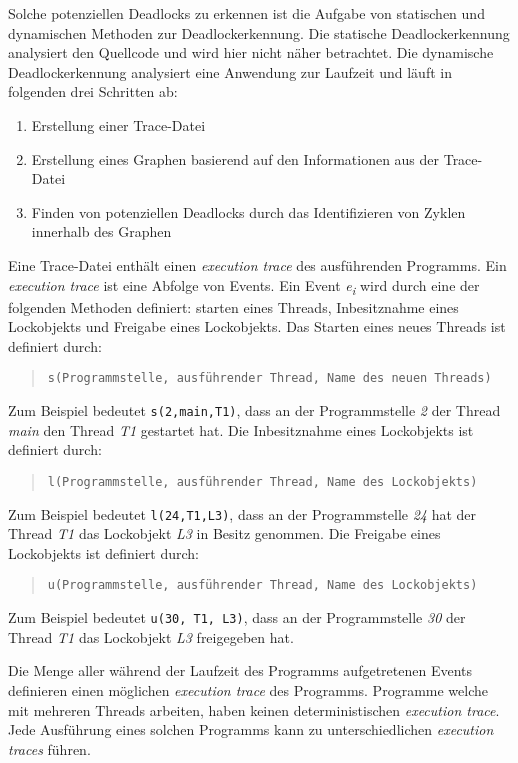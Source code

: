 Solche potenziellen Deadlocks zu erkennen ist die Aufgabe von statischen und
dynamischen Methoden zur Deadlockerkennung. Die statische Deadlockerkennung
analysiert den Quellcode und wird hier nicht näher betrachtet. Die dynamische
Deadlockerkennung analysiert eine Anwendung zur Laufzeit und läuft in folgenden
drei Schritten ab:
\begin{enumerate}
  \item Erstellung einer Trace-Datei
  \item Erstellung eines Graphen basierend auf den Informationen aus der
  Trace-Datei
  \item Finden von potenziellen Deadlocks durch das Identifizieren von Zyklen
  innerhalb des Graphen
\end{enumerate}

Eine Trace-Datei enthält einen \textit{execution trace} des ausführenden
Programms. Ein \textit{execution trace} ist eine Abfolge von Events. Ein Event
\textit{e\textsubscript{i}} wird durch eine der folgenden Methoden definiert:
starten eines Threads, Inbesitznahme eines Lockobjekts und Freigabe eines
Lockobjekts. Das Starten eines neues Threads ist definiert durch:
\begin{quote}
\texttt{s(Programmstelle, ausführender Thread, Name des neuen Threads)}
\end{quote}
Zum Beispiel bedeutet \texttt{s(2,main,T1)}, dass an der Programmstelle
\textit{2} der Thread \textit{main} den Thread \textit{T1} gestartet hat. 
Die Inbesitznahme eines Lockobjekts ist definiert durch:
\begin{quote}
\texttt{l(Programmstelle, ausführender Thread, Name des Lockobjekts)}
\end{quote}
Zum Beispiel bedeutet \texttt{l(24,T1,L3)}, dass
an der Programmstelle \textit{24} hat der Thread \textit{T1} das Lockobjekt
\textit{L3} in Besitz genommen. Die Freigabe eines Lockobjekts ist definiert
durch:
\begin{quote}
\texttt{u(Programmstelle, ausführender Thread, Name des Lockobjekts)}
\end{quote}
Zum Beispiel bedeutet \texttt{u(30, T1, L3)}, dass an der Programmstelle
\textit{30} der Thread \textit{T1} das Lockobjekt \textit{L3} freigegeben hat.

Die Menge aller während der Laufzeit des Programms aufgetretenen Events
definieren einen möglichen \textit{execution trace} des Programms.
Programme welche mit mehreren Threads arbeiten, haben keinen deterministischen
\textit{execution trace}. Jede Ausführung eines solchen Programms kann zu
unterschiedlichen \textit{execution traces} führen. 

